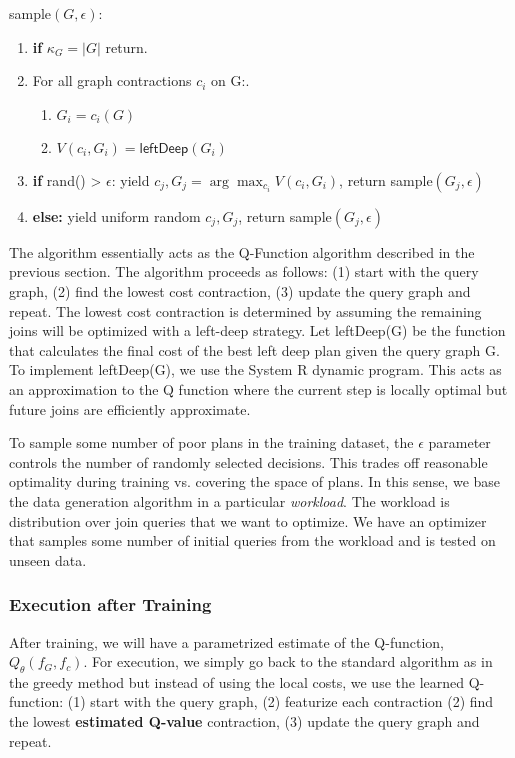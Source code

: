 \textsf{sample}$(G, \epsilon)$:
\begin{enumerate}
    \item \textbf{if} $\kappa_G = |G|$ return.
    \item For all graph contractions $c_i$ on G:.
    \begin{enumerate}
    \item $G_i = c_i(G)$  
    \item $V(c_i, G_i) = \textsf{leftDeep}(G_i)$
    \end{enumerate}
    \item \textbf{if} \textsf{rand()} > $\epsilon$: yield $c_j, G_j = \arg\max_{c_i} V(c_i,G_i)$, return \textsf{sample}$(G_j,\epsilon)$
    \item \textbf{else: } yield uniform random $c_j, G_j $, return \textsf{sample}$(G_j,\epsilon)$
\end{enumerate}

The algorithm essentially acts as the Q-Function algorithm described in the previous section. The algorithm proceeds as follows: (1) start with the query graph, (2) find the lowest cost contraction, (3) update the query graph and repeat. The lowest cost contraction is determined by assuming the remaining joins will be optimized with a left-deep strategy.
Let \textsf{leftDeep}(G) be the function that calculates the final cost of the best left deep plan given the query graph G.
To implement \textsf{leftDeep}(G), we use the System R dynamic program. 
This acts as an approximation to the Q function where the current step is locally optimal but future joins are efficiently approximate.

To sample some number of poor plans in the training dataset, the $\epsilon$ parameter controls the number of randomly selected decisions.
This trades off reasonable optimality during training vs. covering the space of plans.
In this sense, we base the data generation algorithm in a particular \emph{workload}. The workload is distribution over join queries that we want to optimize. 
We have an optimizer that samples some number of initial queries from the workload and is tested on unseen data.

\subsubsection{Execution after Training}
After training, we will have a parametrized estimate of the Q-function, $Q_\theta(f_G,f_c)$. For execution, we simply go back to the standard algorithm as in the greedy method but instead of using the local costs, we use the learned Q-function: (1) start with the query graph, (2) featurize each contraction (2) find the lowest \textbf{estimated Q-value} contraction, (3) update the query graph and repeat.


